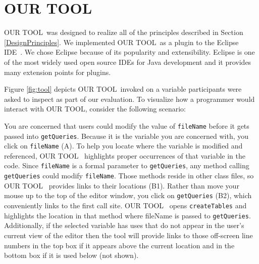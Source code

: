 \documentclass[conference]{IEEEtran}
\newcommand{\toolName}{OUR TOOL}
\begin{document}
\section{\toolName}
\toolName~was designed to realize all of the principles described in Section \ref{DesignPrinciples}. 
We implemented \toolName~as a plugin to the Eclipse IDE~\cite{Eclipse}. 
We chose Eclipse because of its popularity and extensibility. 
Eclipse is one of the most widely used open source IDEs for Java development and it provides many extension points for plugins. 

Figure \ref{fig:tool} depicts \toolName~invoked on a variable participants were asked to inspect as part of our evaluation. To visualize how a programmer would interact with \toolName, consider the following scenario:

You are concerned that users could modify the value of \texttt{fileName} before it gets passed into \texttt{getQueries}. 
Because it is the variable you are concerned with, you click on \texttt{fileName} (A). 
To help you locate where the variable is modified and referenced, \toolName~ highlights proper occurrences of that variable in the code.
Since \texttt{fileName} is a formal parameter to \texttt{getQueries}, any method calling \texttt{getQueries} could modify \texttt{fileName}. 
Those methods reside in other class files, so \toolName~ provides links to their locations (B1).
Rather than move your mouse up to the top of the editor window, you click on \texttt{getQueries} (B2), which conveniently links to the first call site. 
\toolName~ opens \texttt{createTables} and highlights the location in that method where fileName is passed to \texttt{getQueries}.  Additionally, if the selected variable has uses that do not appear in the user's current view of the editor then the tool will provide links to those off-screen line numbers in the top box if it appears above the current location and in the bottom box if it is used below (not shown).

\end{document}
